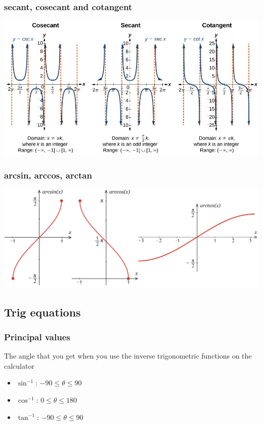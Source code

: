 \documentclass[A4paper]{article}
\begin{document}
	\subsubsection{secant, cosecant and cotangent}
	\includegraphics[scale=0.9]{csc-sec-cot-graphs}

	\subsubsection{arcsin, arccos, arctan}
	\includegraphics[scale=0.7]{arcsincostan}
	
	\subsection{Trig equations}
	\subsubsection{Principal values}
	The angle that you get when you use the inverse trigonometric functions on the calculator
	\begin{itemize}
		\item $\sin^{-1}$: $-90\leq\theta\leq90$
		\item $\cos^{-1}$: $0\leq\theta\leq180$
		\item $\tan^{-1}$: $-90\leq\theta\leq90$
	\end{itemize}
	
\end{document}
